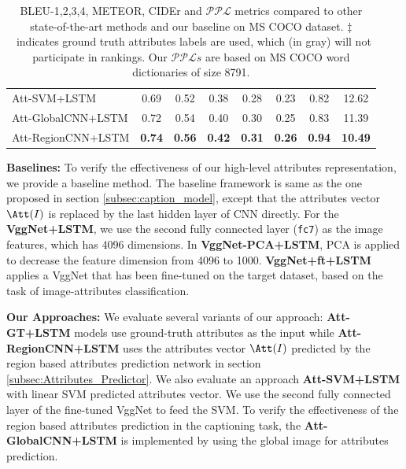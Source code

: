 \begin{table}[t]
\begin{center}
{\begin{tabular}{ l c c c c c c|c}
    Att-SVM+LSTM & 0.69 & 0.52 & 0.38  &0.28 & 0.23& 0.82&12.62  \\
    Att-GlobalCNN+LSTM & 0.72  & 0.54  & 0.40   &0.30  & 0.25 & 0.83 &11.39    \\
    Att-RegionCNN+LSTM & \textbf{0.74} & \textbf{0.56} & \textbf{0.42}  & \textbf{0.31} & \textbf{0.26}& \textbf{0.94}& \textbf{10.49} \\ \hline
  \end{tabular}}
      \vspace{-4pt}
      \caption{BLEU-1,2,3,4, METEOR, CIDEr and $\mathcal{PPL}$ metrics compared to other state-of-the-art methods and our baseline on MS COCO dataset. $\ddagger$~indicates ground truth attributes labels are used, which (in \colorbox[rgb]{0.7,0.7,0.7}{gray}) will not participate in rankings. Our $\mathcal{PPL}s$ are based on MS COCO word dictionaries of size 8791.}
      \label{tab2}
      \vspace{-25pt}
\end{center}
\end{table}

\vspace{3pt}
\noindent\textbf{Baselines:}
To verify the effectiveness of our high-level attributes representation, we provide a baseline method. The baseline framework is same as the one proposed in section \ref{subsec:caption_model}, except that the attributes vector $\Att(I)$ is replaced by the last hidden layer of CNN directly. %
For the \textbf{VggNet+LSTM}, we use the second fully connected layer (\texttt{fc7}) as the image features, which has 4096 dimensions. In \textbf{VggNet-PCA+LSTM}, PCA is applied to decrease the feature dimension from 4096 to 1000. %
\textbf{VggNet+ft+LSTM} applies a VggNet that has been fine-tuned on the target dataset, based on the task of image-attributes classification.

\vspace{3pt}
\noindent\textbf{Our Approaches:}
We evaluate several variants of our approach: \textbf{Att-GT+LSTM} models use ground-truth attributes as the input while \textbf{Att-RegionCNN+LSTM} uses the attributes vector $\Att(I)$ predicted by the region based attributes prediction network in section \ref{subsec:Attributes_Predictor}. We also evaluate an approach \textbf{Att-SVM+LSTM} with linear SVM predicted attributes vector. %
We use the second fully connected layer of the fine-tuned VggNet to feed the SVM. To verify the effectiveness of the region based attributes prediction in the captioning task, the \textbf{Att-GlobalCNN+LSTM} is implemented by using the global image for attributes prediction.

